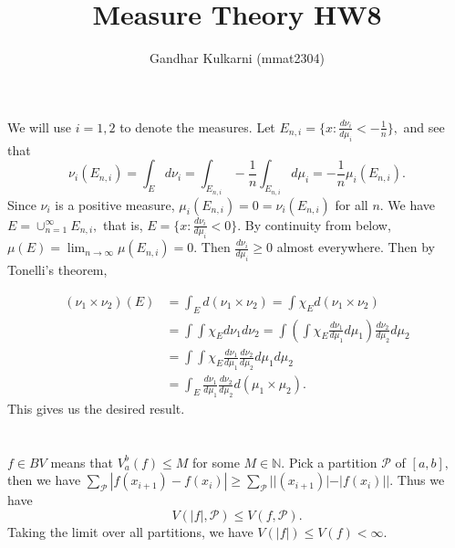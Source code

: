 \documentclass{article}
\title{Measure Theory HW8} %
\author{Gandhar Kulkarni (mmat2304)} %
\date{} %
\begin{document}
\maketitle %


\section{} %
We will use $i=1,2$ to denote the measures. Let $E_{n,i}=\{x: \frac{d\nu_i}{d\mu_i}< -\frac{1}{n}\},$ and see that 
$$\nu_i(E_{n,i})=\int_E d\nu_i= \int_{E_{n,i}}-\frac{1}{n}\int_{E_{n,i}}d\mu_i =- \frac{1}{n} \mu_i(E_{n,i}).$$ Since $\nu_i$ is a positive measure, 
$\mu_i(E_{n,i})=0=\nu_i(E_{n,i})$ for all $n$.  We have $E= \cup_{n=1}^{\infty}E_{n,i},$ that is, $E=\{x: \frac{d\nu_i}{d\mu_i}<0\}.$ 
By continuity from below, $\mu(E)=\lim_{n \to \infty}\mu(E_{n,i})=0.$ Then $\frac{d\nu_i}{d\mu_i}\geq 0$ almost everywhere. Then by Tonelli's theorem, 

\begin{align*}
	(\nu_1 \times \nu_2)(E)&= \int_{E} d(\nu_1 \times \nu_2)= \int \chi_E d(\nu_1 \times \nu_2)\\
	&= \int \int \chi_E d\nu_1 d\nu_2 = \int \left( \int \chi_E \frac{d\nu_1}{d\mu_1} d\mu_1\right)\frac{d\nu_2}{d\mu_2} d\mu_2\\
	&= \int \int \chi_E  \frac{d\nu_1}{d\mu_1} \frac{d\nu_2}{d\mu_2} d\mu_1 d\mu_2\\
	&= \int_E \frac{d\nu_1}{d\mu_1} \frac{d\nu_2}{d\mu_2} d(\mu_1 \times \mu_2).
\end{align*}
This gives us the desired result. 
\section{} %
$f \in BV$ means that $V^b_a(f)\leq M$ for some $M \in \mathbb{N}.$ Pick a partition $\mathcal{P}$ of $[a,b],$ then we have $\sum_{\mathcal{P}} 
|f(x_{i+1})-f(x_i)| \geq \sum_{\mathcal{P}} ||(x_{i+1})| - |f(x_i)||.$ Thus we have $$V(|f|,\mathcal{P}) \leq V(f,\mathcal{P}).$$ Taking the limit over all 
partitions, we have $V(|f|)\leq V(f) < \infty.$ 
\section{} %
\end{document}
